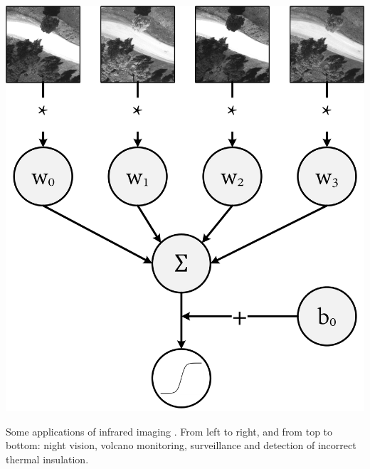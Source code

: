 \begin{marginfigure}[1.5cm]
    \centering
    \includegraphics{figs/fundamentals/cnn_ndvi.png}
    \caption{Some applications of infrared imaging \cite{vollmer_infrared_2017}. From left to right, and from top to bottom: night vision, volcano monitoring, surveillance and detection of incorrect thermal insulation.}
    \label{fig:cnn_dvi}
\end{marginfigure}
